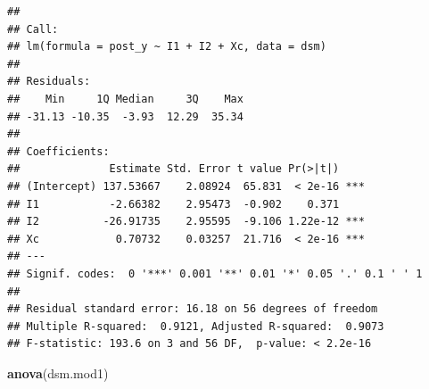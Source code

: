 \documentclass[
]{book}
\newenvironment{Shaded}{\begin{snugshade}}{\end{snugshade}}
\newcommand{\AttributeTok}[1]{\textcolor[rgb]{0.13,0.29,0.53}{#1}}
\newcommand{\DecValTok}[1]{\textcolor[rgb]{0.00,0.00,0.81}{#1}}
\newcommand{\FunctionTok}[1]{\textcolor[rgb]{0.13,0.29,0.53}{\textbf{#1}}}
\newcommand{\NormalTok}[1]{#1}
\newcommand{\OtherTok}[1]{\textcolor[rgb]{0.56,0.35,0.01}{#1}}
\newcommand{\SpecialCharTok}[1]{\textcolor[rgb]{0.81,0.36,0.00}{\textbf{#1}}}
\begin{document}
\begin{Shaded}
\end{Shaded}

\begin{verbatim}
## 
## Call:
## lm(formula = post_y ~ I1 + I2 + Xc, data = dsm)
## 
## Residuals:
##    Min     1Q Median     3Q    Max 
## -31.13 -10.35  -3.93  12.29  35.34 
## 
## Coefficients:
##              Estimate Std. Error t value Pr(>|t|)    
## (Intercept) 137.53667    2.08924  65.831  < 2e-16 ***
## I1           -2.66382    2.95473  -0.902    0.371    
## I2          -26.91735    2.95595  -9.106 1.22e-12 ***
## Xc            0.70732    0.03257  21.716  < 2e-16 ***
## ---
## Signif. codes:  0 '***' 0.001 '**' 0.01 '*' 0.05 '.' 0.1 ' ' 1
## 
## Residual standard error: 16.18 on 56 degrees of freedom
## Multiple R-squared:  0.9121, Adjusted R-squared:  0.9073 
## F-statistic: 193.6 on 3 and 56 DF,  p-value: < 2.2e-16
\end{verbatim}

\begin{Shaded}
\begin{Highlighting}[]
\FunctionTok{anova}\NormalTok{(dsm.mod1)}
\end{Highlighting}
\end{Shaded}
\end{document}
